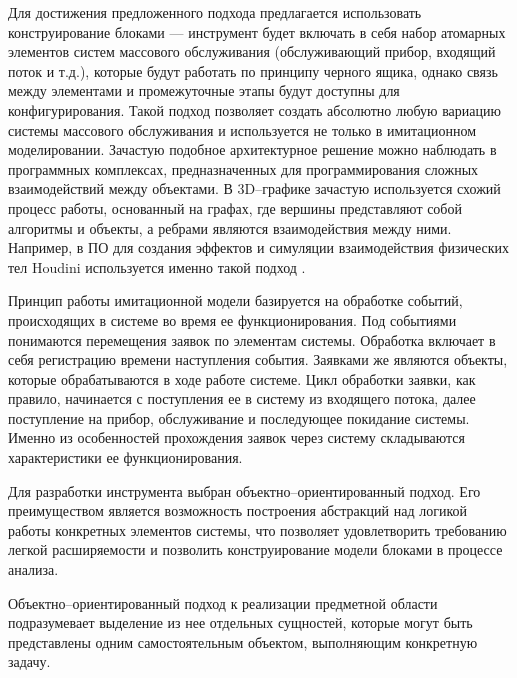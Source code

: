Для достижения предложенного подхода предлагается использовать конструирование блоками \cite{valentin2002simulation} --- инструмент будет включать в себя набор атомарных элементов систем массового обслуживания (обслуживающий прибор, входящий поток и т.д.), которые будут работать по принципу черного ящика, однако связь между элементами и промежуточные этапы будут доступны для конфигурирования. Такой подход позволяет создать абсолютно любую вариацию системы массового обслуживания и используется не только в имитационном моделировании. Зачастую подобное архитектурное решение можно наблюдать в программных комплексах, предназначенных для программирования сложных взаимодействий между объектами. В 3D--графике зачастую используется схожий процесс работы, основанный на графах, где вершины представляют собой алгоритмы и объекты, а ребрами являются взаимодействия между ними. Например, в ПО для создания эффектов и симуляции взаимодействия физических тел Houdini используется именно такой подход \cite{claes2009controlling}.

Принцип работы имитационной модели базируется на обработке событий, происходящих в системе во время ее функционирования. Под событиями понимаются перемещения заявок по элементам системы. Обработка включает в себя регистрацию времени наступления события. Заявками же являются объекты, которые обрабатываются в ходе работе системе. Цикл обработки заявки, как правило, начинается с поступления ее в систему из входящего потока, далее поступление на прибор, обслуживание и последующее покидание системы. Именно из особенностей прохождения заявок через систему складываются характеристики ее функционирования.

Для разработки инструмента выбран объектно--ориентированный подход. Его преимуществом является возможность построения абстракций над логикой работы конкретных элементов системы, что позволяет удовлетворить требованию легкой расширяемости и позволить конструирование модели блоками в процессе анализа. 

Объектно--ориентированный подход \cite{fowler1997analysis} к реализации предметной области подразумевает выделение из нее отдельных сущностей, которые могут быть представлены одним самостоятельным объектом, выполняющим конкретную задачу.

